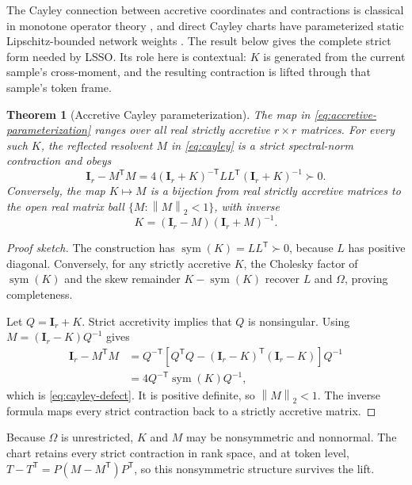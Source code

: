 \documentclass[10pt]{article}
\newtheorem{theorem}{Theorem}[section]
\newcommand{\I}{\mathbf{I}}
\newcommand{\T}{\mathsf{T}}
\newcommand{\norm}[1]{\left\lVert #1 \right\rVert}
\newcommand{\sym}{\operatorname{sym}}
\begin{document}
The Cayley connection between accretive coordinates and contractions is
classical in monotone operator theory \cite{bauschke2017convex}, and direct
Cayley charts have parameterized static Lipschitz-bounded network weights
\cite{wang2023direct}.  The result below gives the complete strict form needed
by LSSO.  Its role here is contextual: $K$ is generated from the current
sample's cross-moment, and the resulting contraction is lifted through that
sample's token frame.

\begin{theorem}[Accretive Cayley parameterization]
\label{thm:accretive-cayley}
The map in \eqref{eq:accretive-parameterization} ranges over all real
strictly accretive $r\times r$ matrices.  For every such $K$, the reflected
resolvent $M$ in \eqref{eq:cayley} is a strict spectral-norm contraction and
obeys
\begin{equation}
    \I_r-M^\T M
    =4(\I_r+K)^{-\T}L L^\T(\I_r+K)^{-1}\succ0.
\label{eq:cayley-defect}
\end{equation}
Conversely, the map $K\mapsto M$ is a bijection from real strictly accretive
matrices to the open real matrix ball $\{M:\norm{M}_2<1\}$, with inverse
\begin{equation}
    K=(\I_r-M)(\I_r+M)^{-1}.
\label{eq:inverse-cayley}
\end{equation}
\end{theorem}

\begin{proof}[Proof sketch]
The construction has
$\sym(K)=LL^\T\succ0$, because $L$ has positive diagonal.  Conversely, for
any strictly accretive $K$, the Cholesky factor of $\sym(K)$ and the skew
remainder $K-\sym(K)$ recover $L$ and $\Omega$, proving completeness.

Let $Q=\I_r+K$.  Strict accretivity implies that $Q$ is nonsingular.  Using
$M=(\I_r-K)Q^{-1}$ gives
\begin{align}
    \I_r-M^\T M
    &=Q^{-\T}\left[Q^\T Q-(\I_r-K)^\T(\I_r-K)\right]Q^{-1}\\
    &=4Q^{-\T}\sym(K)Q^{-1},
\end{align}
which is \eqref{eq:cayley-defect}.  It is positive definite, so
$\norm{M}_2<1$.
The inverse formula maps every strict contraction back to a strictly
accretive matrix.
\end{proof}

Because $\Omega$ is unrestricted, $K$ and $M$ may be nonsymmetric and
nonnormal.  The chart retains every strict contraction in rank space, and at
token level,
$T-T^\T=P(M-M^\T)P^\T$, so this nonsymmetric structure survives the lift.
\end{document}
